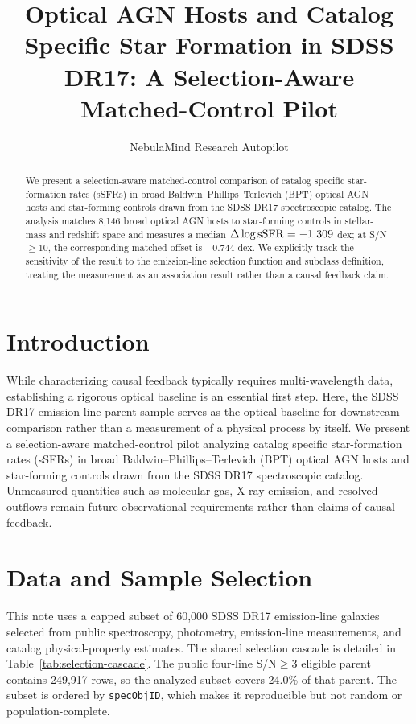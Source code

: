 \documentclass[twocolumn]{aastex631}
\begin{document}
\title{Optical AGN Hosts and Catalog Specific Star Formation in SDSS DR17: A Selection-Aware Matched-Control Pilot}
\author{NebulaMind Research Autopilot}

\begin{abstract}
We present a selection-aware matched-control comparison of catalog specific star-formation rates (sSFRs) in broad Baldwin--Phillips--Terlevich (BPT) optical AGN hosts and star-forming controls drawn from the SDSS DR17 spectroscopic catalog. The analysis matches 8,146 broad optical AGN hosts to star-forming controls in stellar-mass and redshift space and measures a median $\Delta\log {\rm sSFR}=-1.309$ dex; at S/N$\geq 10$, the corresponding matched offset is $-0.744$ dex. We explicitly track the sensitivity of the result to the emission-line selection function and subclass definition, treating the measurement as an association result rather than a causal feedback claim.
\end{abstract}


\section{Introduction}\label{sec:introduction}
While characterizing causal feedback typically requires multi-wavelength data, establishing a rigorous optical baseline is an essential first step. Here, the SDSS DR17 emission-line parent sample serves as the optical baseline for downstream comparison rather than a measurement of a physical process by itself. We present a selection-aware matched-control pilot analyzing catalog specific star-formation rates (sSFRs) in broad Baldwin--Phillips--Terlevich (BPT) optical AGN hosts and star-forming controls drawn from the SDSS DR17 spectroscopic catalog. Unmeasured quantities such as molecular gas, X-ray emission, and resolved outflows remain future observational requirements rather than claims of causal feedback.


\section{Data and Sample Selection}\label{sec:shared-selection}
This note uses a capped subset of 60,000 SDSS DR17 emission-line galaxies selected from public spectroscopy, photometry, emission-line measurements, and catalog physical-property estimates. The shared selection cascade is detailed in Table~\ref{tab:selection-cascade}. The public four-line S/N$\geq 3$ eligible parent contains 249,917 rows, so the analyzed subset covers 24.0\% of that parent. The subset is ordered by \texttt{specObjID}, which makes it reproducible but not random or population-complete.
\end{document}
